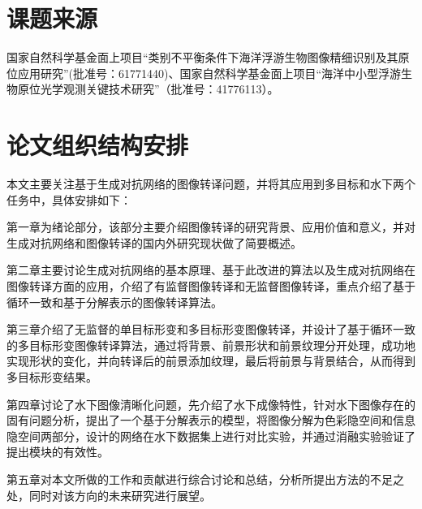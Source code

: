 \section{课题来源}

国家自然科学基金面上项目“类别不平衡条件下海洋浮游生物图像精细识别及其原位应用研究”(批准号：61771440)、国家自然科学基金面上项目“海洋中小型浮游生物原位光学观测关键技术研究”（批准号：41776113）。

\section{论文组织结构安排}

本文主要关注基于生成对抗网络的图像转译问题，并将其应用到多目标和水下两个任务中，具体安排如下：

第一章为绪论部分，该部分主要介绍图像转译的研究背景、应用价值和意义，并对生成对抗网络和图像转译的国内外研究现状做了简要概述。

第二章主要讨论生成对抗网络的基本原理、基于此改进的算法以及生成对抗网络在图像转译方面的应用，介绍了有监督图像转译和无监督图像转译，重点介绍了基于循环一致和基于分解表示的图像转译算法。

第三章介绍了无监督的单目标形变和多目标形变图像转译，并设计了基于循环一致的多目标形变图像转译算法，通过将背景、前景形状和前景纹理分开处理，成功地实现形状的变化，并向转译后的前景添加纹理，最后将前景与背景结合，从而得到多目标形变结果。

第四章讨论了水下图像清晰化问题，先介绍了水下成像特性，针对水下图像存在的固有问题分析，提出了一个基于分解表示的模型，将图像分解为色彩隐空间和信息隐空间两部分，设计的网络在水下数据集上进行对比实验，并通过消融实验验证了提出模块的有效性。

第五章对本文所做的工作和贡献进行综合讨论和总结，分析所提出方法的不足之处，同时对该方向的未来研究进行展望。
